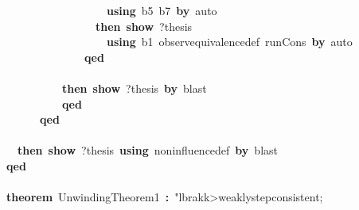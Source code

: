 \documentclass{article}
\newcommand{\syntaxKEYWORDA}[1]{\textcolor[rgb]{0.0,0.4,0.6}{\textbf{#1}}}
\newcommand{\syntaxKEYWORDC}[1]{\textcolor[rgb]{0.0,0.6,1.0}{\textbf{#1}}}
\newcommand{\syntaxLITERALA}[1]{\textcolor[rgb]{1.0,0.0,0.8}{#1}}
\newcommand{\syntaxOPERATOR}[1]{\textcolor[rgb]{0.0,0.0,0.0}{\textbf{#1}}}
\newcommand{\syntaxKEYWORDA}[1]{\textcolor[rgb]{0.0,0.4,0.6}{\textbf{#1}}}
\newcommand{\syntaxKEYWORDC}[1]{\textcolor[rgb]{0.0,0.6,1.0}{\textbf{#1}}}
\newcommand{\syntaxLITERALA}[1]{\textcolor[rgb]{1.0,0.0,0.8}{#1}}
\newcommand{\syntaxOPERATOR}[1]{\textcolor[rgb]{0.0,0.0,0.0}{\textbf{#1}}}
\newcommand{\syntaxKEYWORDA}[1]{\textcolor[rgb]{0.0,0.4,0.6}{\textbf{#1}}}
\newcommand{\syntaxKEYWORDC}[1]{\textcolor[rgb]{0.0,0.6,1.0}{\textbf{#1}}}
\newcommand{\syntaxLITERALA}[1]{\textcolor[rgb]{1.0,0.0,0.8}{#1}}
\newcommand{\syntaxOPERATOR}[1]{\textcolor[rgb]{0.0,0.0,0.0}{\textbf{#1}}}
\newcommand{\syntaxKEYWORDA}[1]{\textcolor[rgb]{0.0,0.4,0.6}{#1}}
\newcommand{\syntaxKEYWORDC}[1]{\textcolor[rgb]{0.0,0.6,1.0}{#1}}
\newcommand{\syntaxLITERALA}[1]{\textcolor[rgb]{1.0,0.0,0.8}{\textbf{#1}}}
\newcommand{\syntaxOPERATOR}[1]{\textcolor[rgb]{0.0,0.0,0.0}{#1}}
\newcommand{\syntaxKEYWORDA}[1]{\textcolor[rgb]{0.0,0.4,0.6}{\textbf{#1}}}
\newcommand{\syntaxKEYWORDC}[1]{\textcolor[rgb]{0.0,0.6,1.0}{\textbf{#1}}}
\newcommand{\syntaxLITERALA}[1]{\textcolor[rgb]{1.0,0.0,0.8}{#1}}
\newcommand{\syntaxOPERATOR}[1]{\textcolor[rgb]{0.0,0.0,0.0}{\textbf{#1}}}
\newcommand{\syntaxKEYWORDA}[1]{\textcolor[rgb]{0.0,0.4,0.6}{\textbf{#1}}}
\newcommand{\syntaxKEYWORDC}[1]{\textcolor[rgb]{0.0,0.6,1.0}{\textbf{#1}}}
\newcommand{\syntaxLITERALA}[1]{\textcolor[rgb]{1.0,0.0,0.8}{#1}}
\newcommand{\syntaxOPERATOR}[1]{\textcolor[rgb]{0.0,0.0,0.0}{\textbf{#1}}}
\begin{document}
{\ }{\ }{\ }{\ }{\ }{\ }{\ }{\ }{\ }{\ }{\ }{\ }{\ }{\ }{\ }{\ }{\ }{\ }{\ }{\ }{\ }{\ }\syntaxKEYWORDA{using}{\ }b5{\ }b7{\ }\syntaxKEYWORDA{by}{\ }auto\hspace*{\fill}\\
{\ }{\ }{\ }{\ }{\ }{\ }{\ }{\ }{\ }{\ }{\ }{\ }{\ }{\ }{\ }{\ }{\ }{\ }{\ }{\ }\syntaxKEYWORDA{then}{\ }\syntaxKEYWORDC{show}{\ }?thesis\hspace*{\fill}\\
{\ }{\ }{\ }{\ }{\ }{\ }{\ }{\ }{\ }{\ }{\ }{\ }{\ }{\ }{\ }{\ }{\ }{\ }{\ }{\ }{\ }{\ }\syntaxKEYWORDA{using}{\ }b1{\ }observ\usebox{\underscorebox}equivalence\usebox{\underscorebox}def{\ }run\usebox{\underscorebox}Cons{\ }\syntaxKEYWORDA{by}{\ }auto\hspace*{\fill}\\
{\ }{\ }{\ }{\ }{\ }{\ }{\ }{\ }{\ }{\ }{\ }{\ }{\ }{\ }{\ }{\ }{\ }{\ }\syntaxKEYWORDA{qed}\hspace*{\fill}\\
{\ }{\ }{\ }{\ }{\ }{\ }{\ }{\ }{\ }{\ }{\ }{\ }{\ }{\ }\syntaxKEYWORDA{\usebox{\closecurlybracket}}\hspace*{\fill}\\
{\ }{\ }{\ }{\ }{\ }{\ }{\ }{\ }{\ }{\ }{\ }{\ }{\ }{\ }\syntaxKEYWORDA{then}{\ }\syntaxKEYWORDC{show}{\ }?thesis{\ }\syntaxKEYWORDA{by}{\ }blast\hspace*{\fill}\\
{\ }{\ }{\ }{\ }{\ }{\ }{\ }{\ }{\ }{\ }{\ }{\ }{\ }{\ }\syntaxKEYWORDA{qed}\hspace*{\fill}\\
{\ }{\ }{\ }{\ }{\ }{\ }{\ }{\ }{\ }{\ }\syntaxKEYWORDA{qed}\hspace*{\fill}\\
{\ }{\ }{\ }{\ }{\ }{\ }{\ }{\ }{\ }{\ }\syntaxKEYWORDA{\usebox{\closecurlybracket}}\hspace*{\fill}\\
{\ }{\ }{\ }{\ }{\ }{\ }\syntaxKEYWORDA{then}{\ }\syntaxKEYWORDC{show}{\ }?thesis{\ }\syntaxKEYWORDA{using}{\ }noninfluence\usebox{\underscorebox}def{\ }\syntaxKEYWORDA{by}{\ }blast\hspace*{\fill}\\
{\ }{\ }{\ }{\ }\syntaxKEYWORDA{qed}\hspace*{\fill}\\
\hspace*{\fill}\\
{\ }{\ }{\ }{\ }\syntaxKEYWORDA{theorem}{\ }UnwindingTheorem1{\ }\syntaxOPERATOR{:}{\ }\syntaxLITERALA{"\<lbrakk>weakly\usebox{\underscorebox}step\usebox{\underscorebox}consistent;}\hspace*{\fill}\\
\end{document}
